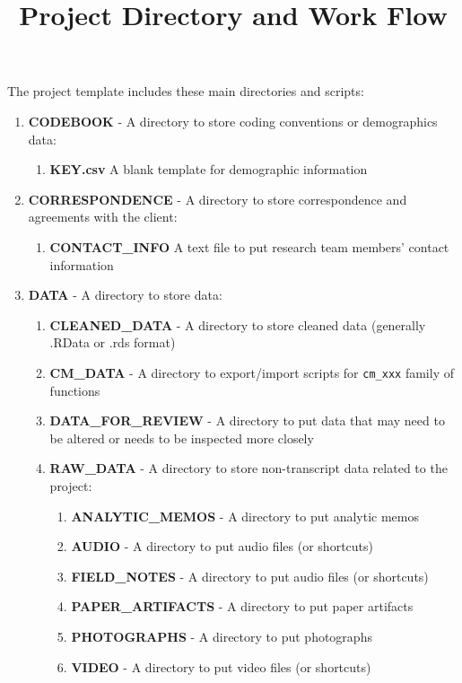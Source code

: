 \documentclass{article}\usepackage[]{graphicx}\usepackage[]{color}
\begin{document}
\title{Project Directory and Work Flow}
\author{}
\date{}
\maketitle

The project template includes these main directories and scripts:

\begin{enumerate}
  \item \textbf{CODEBOOK} - A directory to store coding conventions or demographics data:
  \begin{enumerate}
    \item \textbf{KEY.csv} A blank template for demographic information
  \end{enumerate}  
  \item \textbf{CORRESPONDENCE} - A directory to store correspondence and agreements 
     with the client:
  \begin{enumerate}
     \item \textbf{CONTACT\_INFO} A text file to put research team members' 
       contact information
  \end{enumerate}  
  \item \textbf{DATA} - A directory to store data:
    \begin{enumerate}
      \item \textbf{CLEANED\_DATA} - A directory to store cleaned data (generally .RData or .rds format)
      \item \textbf{CM\_DATA} - A directory to export/import scripts for \texttt{cm\_xxx} family of functions
  \item \textbf{DATA\_FOR\_REVIEW} - A directory to put data that may need to be altered or needs to be inspected more closely
  \item \textbf{RAW\_DATA} - A directory to store non-transcript data related to the project:
  \begin{enumerate}
     \item \textbf{ANALYTIC\_MEMOS} - A directory to put analytic memos
     \item \textbf{AUDIO} - A directory to put audio files (or shortcuts)
     \item \textbf{FIELD\_NOTES} - A directory to put audio files (or shortcuts)
     \item \textbf{PAPER\_ARTIFACTS} - A directory to put paper artifacts 
     \item \textbf{PHOTOGRAPHS} - A directory to put photographs
     \item \textbf{VIDEO} - A directory to put video files (or shortcuts)

\end{enumerate}
\end{enumerate}
\end{enumerate}
\end{document}
